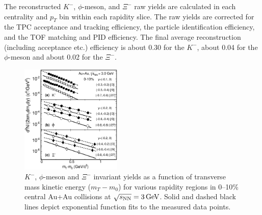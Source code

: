 \documentclass[%
 reprint,	
showpacs,
 amsmath,amssymb,
 aps,
 prc,
]{revtex4-1}
\begin{document}
The reconstructed $K^-$, $\phi$-meson, and $\Xi^-$ raw yields are calculated in each centrality and $p_{T}$ bin within each rapidity slice. 
The raw yields are corrected for the TPC acceptance and tracking efficiency, %
the particle identification efficiency, %
and the TOF matching and PID efficiency. The final average reconstruction (including acceptance etc.) efficiency is about 0.30 for the $K^-$, about 0.04 for the $\phi$-meson and about 0.02 for the $\Xi^-$.

\begin{figure}
\centering
\hspace*{-4mm}
\includegraphics[width=0.43\textwidth]{fig/fig2_h_mT_spectra_phiMeson.eps}
  \caption{ $K^-$, $\phi$-meson and $\Xi^-$ invariant yields as a function of transverse mass kinetic energy ($m_T-m_0$) for various rapidity regions in 0--10\% central Au+Au collisions at ${\sqrt{s_{\rm NN}} = \rm{3\,GeV}}$. Solid and dashed black lines depict exponential function fits to the measured data points.}
\label{fig:phimTSpectra} 
\end{figure}
\end{document}
